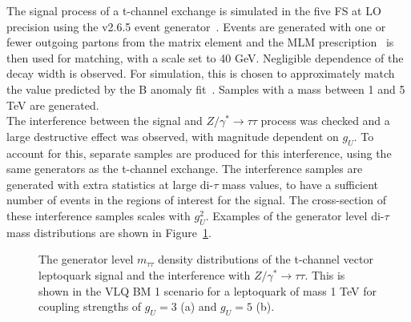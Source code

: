 The signal process of a t-channel exchange is simulated in the five \ac{FS} at \ac{LO} precision using the \MGvATNLO v2.6.5 event generator~\cite{Alwall:2011uj}.
Events are generated with one or fewer outgoing partons from the matrix element and the MLM prescription~\cite{Frederix:2012ps} is then used for matching, with a scale set to 40 GeV.
Negligible dependence of the decay width is observed. 
For simulation, this is chosen to approximately match the value predicted by the B anomaly fit~\cite{Cornella:2021sby}.
Samples with a mass between 1 and 5 TeV are generated. \\

The interference between the signal and $Z/\gamma^* \rightarrow \tau\tau$ process was checked and a large destructive effect was observed, with magnitude dependent on $g_{U}$.
To account for this, separate samples are produced for this interference, using the same generators as the t-channel exchange.
The interference samples are generated with extra statistics at large di-$\tau$ mass values, to have a sufficient number of events in the regions of interest for the signal.
The cross-section of these interference samples scales with $g_{U}^2$. 
Examples of the generator level di-$\tau$ mass distributions are shown in Figure~\ref{fig:vlq_signal}. \\

\begin{figure}[!hbtp]
\centering
\caption[Plots of the vector leptoquark generator level $m_{\tau\tau}$ distributions, when changing $g_{U}$.]{The generator level $m_{\tau\tau}$ density distributions of the t-channel vector leptoquark signal and the interference with $Z/\gamma^* \rightarrow \tau\tau$. This is shown in the VLQ BM 1 scenario for a leptoquark of mass 1 TeV for coupling strengths of $g_{U}=3$ (a) and $g_{U}=5$ (b).}
\label{fig:vlq_signal}
\end{figure}

